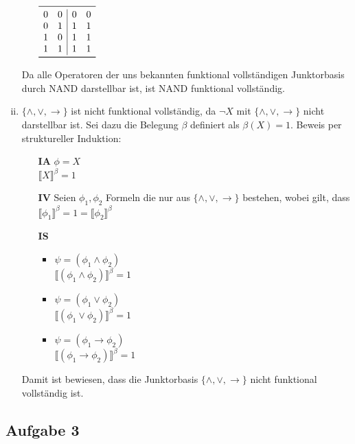 \documentclass[a4paper,10pt]{article}
\begin{document}
\begin{enumerate}[(i)]
\begin{itemize}
\begin{math}
\begin{array}{cc|cc}
\midrule
0 & 0 & 0 & 0 \\
0 & 1 & 1 & 1 \\
1 & 0 & 1 & 1 \\
1 & 1 & 1 & 1 \\
\bottomrule
\end{array}
\end{math}
\end{itemize}
Da alle Operatoren der uns bekannten funktional vollständigen Junktorbasis durch \textsf{NAND} darstellbar ist, ist \textsf{NAND} funktional vollständig.
\item $\{\land, \lor, \rightarrow \}$ ist nicht funktional vollständig, da $\lnot X$ mit $\{\land, \lor, \rightarrow \}$  nicht darstellbar ist. Sei dazu die Belegung $\beta$ definiert als $\beta(X) = 1$.
Beweis per struktureller Induktion:
\begin{itemize}
\item[\textbf{IA}] $\phi = X$ \\
$\llbracket X \rrbracket^{\beta} = 1$
\item[\textbf{IV}] Seien $\phi_1, \phi_2$ Formeln die nur aus   $\{\land, \lor, \rightarrow \}$ bestehen, wobei gilt, dass $\llbracket \phi_1 \rrbracket^{\beta} = 1 = \llbracket \phi_2 \rrbracket^{\beta} $
\item[\textbf{IS}] 
\begin{itemize}
\item $\psi = (\phi_1 \land \phi_2)$ \\
$\llbracket  (\phi_1 \land \phi_2) \rrbracket^\beta = 1$
\item $\psi = (\phi_1 \lor \phi_2)$ \\
$\llbracket  (\phi_1 \lor\phi_2) \rrbracket^\beta = 1$
\item $\psi = (\phi_1 \rightarrow \phi_2)$ \\
$\llbracket  (\phi_1 \rightarrow \phi_2) \rrbracket^\beta = 1$
\end{itemize}
\end{itemize}
Damit ist bewiesen, dass die Junktorbasis $\{\land, \lor, \rightarrow \}$ nicht funktional vollständig ist.
\end{enumerate}

\subsection*{Aufgabe 3}
\end{document}
